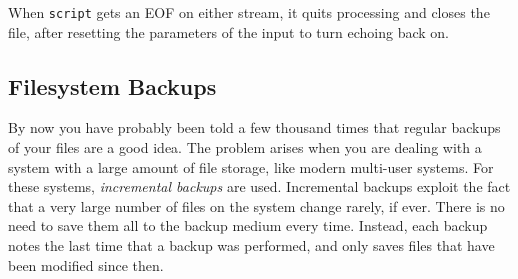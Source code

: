 
When \texttt{script} gets an EOF on either stream, it quits processing
and closes the file, after resetting the parameters of the input to
turn echoing back on. 


\subsection{Filesystem Backups}

By now you have probably been told a few thousand times that regular
backups of your files are a good idea. The problem
arises when you are dealing with a system with a large amount of file
storage, like modern multi-user systems. For these systems,
\textit{incremental backups} are used. Incremental backups exploit the
fact that a very large number of files on the system change rarely, if
ever. There is no need to save them all to the backup medium every
time. Instead, each backup notes the last time that a backup was
performed, and only saves files that have been modified since then. 

